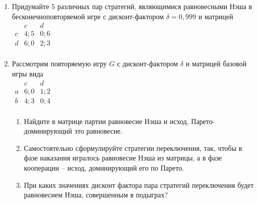 \documentclass[pdftex,12pt,a4paper]{article}
\begin{document}
\begin{enumerate}
\item Придумайте 5 различных пар стратегий, являющимися равновесными Нэша в бесконечноповторяемой игре с дисконт-фактором $\delta=0,999$ и матрицей \\
$\begin{array}{c|cc}
 & c & d \\
\hline
c & 4;5 & 0;6 \\
d & 6;0 & 2;3 \\
\end{array}$ 

\item Рассмотрим повторяемую игру $G$ с дисконт-фактором $\delta $ и матрицей базовой игры вида\\
$\begin{array}{c|cc}
    {} &  c & d   \\
\hline
    a &  {6;0} & {1;2}   \\
    b &  {4;3} & {0;4}   \\
\end{array}$
\begin{enumerate}
\item Найдите в матрице партии равновесие Нэша и исход, Парето-доминирующий это равновесие.
\item Самостоятельно сформулируйте стратегии переключения, так, чтобы в фазе наказания игралось равновесие Нэша из матрицы, а в фазе кооперации – исход, доминирующий его по Парето. 
\item При каких значениях дисконт фактора пара стратегий переключения будет равновесием Нэша, совершенным в подыграх?
\end{enumerate}


\end{enumerate}
\end{document}
